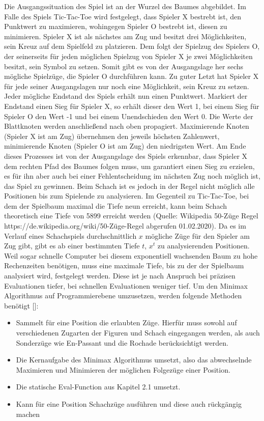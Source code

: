 Die Ausgangssituation des Spiel ist an der Wurzel des Baumes abgebildet.
Im Falle des Spiels Tic-Tac-Toe wird festgelegt, dass Spieler X bestrebt ist, den Punktwert zu maximieren, wohingegen Spieler O bestrebt ist, diesen zu minimieren.
Spieler X ist als nächstes am Zug und besitzt drei Möglichkeiten, sein Kreuz auf dem Spielfeld zu platzieren.
Dem folgt der Spielzug des Spielers O, der seinerseits für jeden möglichen Spielzug von Spieler X je zwei Möglichkeiten besitzt, sein Symbol zu setzen.
Somit gibt es von der Ausgangslage her sechs mögliche Spielzüge, die Spieler O durchführen kann.
Zu guter Letzt hat Spieler X für jede seiner Ausgangslagen nur noch eine Möglichkeit, sein Kreuz zu setzen.
Jeder mögliche Endstand des Spiels erhält nun einen Punktwert.
Markiert der Endstand einen Sieg für Spieler X, so erhält dieser den Wert 1, bei einem Sieg für Spieler O den Wert -1 und bei einem Unendschieden den Wert 0.
Die Werte der Blattknoten werden anschließend nach oben propagiert.
Maximierende Knoten (Spieler X ist am Zug) übernehmen den jeweils höchsten Zahlenwert, minimierende Knoten (Spieler O ist am Zug) den niedrigsten Wert.
Am Ende dieses Prozesses ist von der Ausgangslage des Spiels erkennbar, dass Spieler X dem rechten Pfad des Baumes folgen muss, um garantiert einen Sieg zu erzielen, es für ihn aber auch bei einer Fehlentscheidung im nächsten Zug noch möglich ist, das Spiel zu gewinnen.
Beim Schach ist es jedoch in der Regel nicht möglich alle Positionen bis zum Spielende zu analysieren.
Im Gegenteil zu Tic-Tac-Toe, bei dem der Spielbaum maximal die Tiefe neun erreicht, kann beim Schach theoretisch eine Tiefe von 5899 erreicht werden (Quelle: Wikipedia 50-Züge Regel https://de.wikipedia.org/wiki/50-Züge-Regel abgerufen 01.02.2020).
Da es im Verlauf eines Schachspiels durchschnittlich $x$ mögliche Züge für den Spieler am Zug gibt, gibt es ab einer bestimmten Tiefe $t$, $x^t$ zu analysierenden Positionen.
Weil sogar schnelle Computer bei diesem exponentiell wachsenden Baum zu hohe Rechenzeiten benötigen, muss eine maximale Tiefe, bis zu der der Spielbaum analysiert wird, festgelegt werden.
Diese ist je nach Anspruch bei präzisen Evaluationen tiefer, bei schnellen Evaluationen weniger tief.
Um den Minimax Algorithmus auf Programmierebene umzusetzen, werden folgende Methoden benötigt [\cite{Shannon1950}]:

\begin{itemize}
    \item Sammelt für eine Position die erlaubten Züge. Hierfür muss sowohl auf verschiedenen Zugarten der Figuren und Schach eingegangen werden, als auch Sonderzüge wie En-Passant und die Rochade berücksichtigt werden.
    \item Die Kernaufgabe des Minimax Algorithmus umsetzt, also das abwechselnde Maximieren und Minimieren der möglichen Folgezüge einer Position.
    \item Die statische Eval-Function aus Kapitel 2.1 umsetzt.
    \item Kann für eine Position Schachzüge ausführen und diese auch rückgängig machen
\end{itemize}

